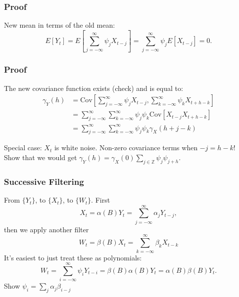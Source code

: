\documentclass{beamer}
\begin{document}

\begin{frame}
\frametitle{Proof}


New mean in terms of the old mean:
\[
E[Y_t] = E\left[\sum_{j=-\infty}^{\infty} \psi_j X_{t-j}\right] = \sum_{j=-\infty}^{\infty} \psi_j E[X_{t-j}] = 0.
\]

\end{frame}


\begin{frame}
\frametitle{Proof}

The new covariance function exists (check) and is equal to:
\begin{align*}
\gamma_Y(h) &= \text{Cov}\left[\sum_{j=-\infty}^{\infty} \psi_j X_{t-j}, \sum_{k=-\infty}^{\infty} \psi_k X_{t+h-k}  \right]  \\
&=  \sum_{j=-\infty}^{\infty}\sum_{k=-\infty}^{\infty} \psi_j\psi_k \text{Cov}\left[ X_{t-j} X_{t+h-k} \right] \tag{*} \\
&= \sum_{j=-\infty}^{\infty}\sum_{k=-\infty}^{\infty} \psi_j\psi_k \gamma_X(h+j-k)
\end{align*}

Special case: $X_t$ is white noise. Non-zero covariance terms when $-j = h-k$! Show that we would get $\gamma_Y(h) = \gamma_X(0) \sum_{j \in \mathbb{Z}} \psi_j \psi_{j+h}$.

\end{frame}


\begin{frame}
\frametitle{Successive Filtering}

From $\{Y_t\}$, to $\{X_t\}$, to $\{W_t\}$. First
\[
X_t = \alpha(B)Y_t = \sum_{j=-\infty}^{\infty} \alpha_j Y_{t-j},
\]
then we apply another filter
\[
W_t = \beta(B)X_t = \sum_{k=-\infty}^{\infty} \beta_k X_{t-k}
\]
It's easiest to just treat these as polynomials:
\[
W_t = \sum_{i=-\infty}^{\infty} \psi_i Y_{t-i} = \beta(B)\alpha(B)Y_t = \alpha(B)\beta(B) Y_t.
\]
Show $\psi_i = \sum_j \alpha_j \beta_{i-j}$
\end{frame}
\end{document}
